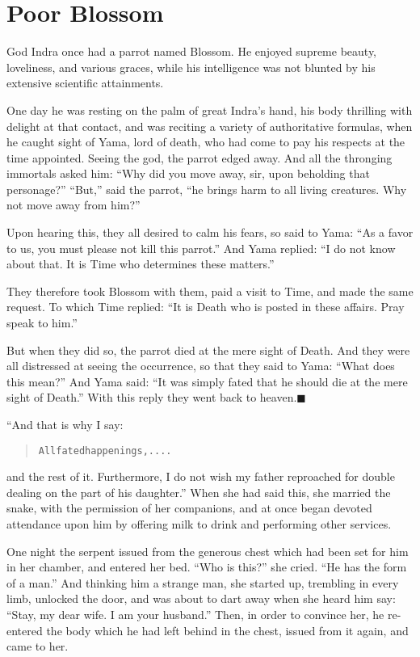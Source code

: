 \documentclass[article, twoside, 14pt]{memoir}
\newcommand{\qed}{\hfill \ensuremath{\blacksquare}}
\renewenvironment{verbatim}{%
\begin{quote}%
\vskip -10pt%
\begin{alltt}\normalfont\large}{\end{alltt}%
\end{quote}%
\vskip -10pt
} %
\begin{document}
\chapter{Poor Blossom}

God Indra once had a parrot named Blossom. He enjoyed supreme
beauty, loveliness, and various graces, while his intelligence was
not blunted by his extensive scientific attainments.

One day he was resting on the palm of great Indra's hand, his body
thrilling with delight at that contact, and was reciting a variety
of authoritative formulas, when he caught sight of Yama, lord of
death, who had come to pay his respects at the time appointed.
Seeing the god, the parrot edged away. And all the thronging
immortals asked him:
``Why did you move away, sir, upon beholding that personage?''
``But,'' said the parrot,
``he brings harm to all living creatures. Why not move away from him?''

Upon hearing this, they all desired to calm his fears, so said to
Yama: ``As a favor to us, you must please not kill this parrot.''
And Yama replied:
``I do not know about that. It is Time who determines these matters.''

They therefore took Blossom with them, paid a visit to Time, and
made the same request. To which Time replied:
``It is Death who is posted in these affairs. Pray speak to him.''

But when they did so, the parrot died at the mere sight of Death.
And they were all distressed at seeing the occurrence, so that they
said to Yama: ``What does this mean?'' And Yama said:
``It was simply fated that he should die at the mere sight of Death.''
With this reply they went back to heaven.\hyperref[s27]{\qed}

“And that is why I say:

\begin{verbatim}
All fated happenings, ....
\end{verbatim}
and the rest of it. Furthermore, I do not wish my father reproached
for double dealing on the part of his daughter.” When she had said
this, she married the snake, with the permission of her companions,
and at once began devoted attendance upon him by offering milk to
drink and performing other services.

One night the serpent issued from the generous chest which had been
set for him in her chamber, and entered her bed. ``Who is this?''
she cried. ``He has the form of a man.'' And thinking him a strange
man, she started up, trembling in every limb, unlocked the door,
and was about to dart away when she heard him say:
``Stay, my dear wife. I am your husband.'' Then, in order to
convince her, he re-entered the body which he had left behind in
the chest, issued from it again, and came to her.
\end{document}
